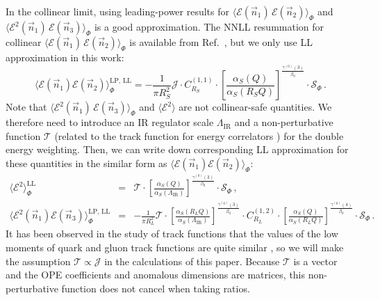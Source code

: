 \documentclass[letterpaper,11pt]{article}
\DeclareRobustCommand{\Ref}[1]{Ref.~\cite{#1}}
\begin{document}
In the collinear limit, using leading-power results for $\langle \mathcal{E}(\vec{n}_1) \, \mathcal{E}(\vec{n}_2) \rangle_\Phi $ and $\langle  \mathcal{E}^2(\vec{n}_1) \, \mathcal{E}(\vec{n}_3)\rangle_\Phi$ is a good approximation.
%
The NNLL resummation for collinear $\langle \mathcal{E}(\vec{n}_1) \, \mathcal{E}(\vec{n}_2) \rangle_\Phi $ is available from \Ref{Dixon:2019uzg}, but we only use LL approximation in this work:
%
\begin{equation}
\langle \mathcal{E}(\vec{n}_1) \mathcal{E}(\vec{n}_2) \rangle_\Phi^{\mathrm{LP,\, LL}} = -\frac{1}{\pi R_S^2}\mathcal{J}\cdot C_{R_S}^{(1,1)}\cdot
\left[\frac{\alpha_S(Q)}{\alpha_S(R_S Q)}\right]^{\frac{\gamma^{(0)}(3)}{\beta_0}}
\cdot \mathcal{S}_\Phi \,.
\end{equation}
%
Note that $\langle  \mathcal{E}^2(\vec{n}_1) \, \mathcal{E}(\vec{n}_3)\rangle_\Phi$ and $\langle \mathcal{E}^2 \rangle$ are not collinear-safe quantities.
%
We therefore need to introduce an IR regulator scale $\Lambda_{\mathrm{IR}}$ and a non-perturbative function $\mathcal{T}$ (related to the track function for energy correlators \cite{Chang:2013rca,Chang:2013iba,Elder:2017bkd,Chen:2020vvp,Li:2021zcf,Jaarsma:2022kdd}) for the double energy weighting.
%
Then, we can write down corresponding LL approximation for these quantities in the similar form as $\langle \mathcal{E}(\vec{n}_1) \mathcal{E}(\vec{n}_2) \rangle_\Phi $:
%
\begin{eqnarray}
\langle \mathcal{E}^2\rangle_\Phi^{\mathrm{LL}} 
&=&\mathcal{T}\cdot
\left[\frac{\alpha_S(Q)}{\alpha_S(\Lambda_{\mathrm{IR}})}\right]^{\frac{\gamma^{(0)}(3)}{\beta_0}}
\cdot \mathcal{S}_\Phi\,, \\
\langle\mathcal{E}^2(\vec{n}_1)\mathcal{E}(\vec{n}_3)\rangle_\Phi^{\mathrm{LP,\, LL}}
&=& -\frac{1}{\pi R_L^2}\mathcal{T}\cdot
\left[\frac{\alpha_S(R_L Q)}{\alpha_S(\Lambda_{\mathrm{IR}})}\right]^{\frac{\gamma^{(0)}(3)}{\beta_0}}
\cdot
C_{R_L}^{(1,2)}
\cdot
\left[\frac{\alpha_S(Q)}{\alpha_S(R_L Q)}\right]^{\frac{\gamma^{(0)}(4)}{\beta_0}}
\cdot \mathcal{S}_\Phi\,.
\end{eqnarray}
It has been observed in the study of track functions that the values of the low moments of quark and gluon track functions are quite similar \cite{Jaarsma:2022kdd}, so we will make the assumption $\mathcal{T} \propto \mathcal{J}$ in the calculations of this paper.
%
Because $\mathcal{T}$ is a vector and the OPE coefficients and anomalous dimensions are matrices, this non-perturbative function does not cancel when taking ratios.
\end{document}

